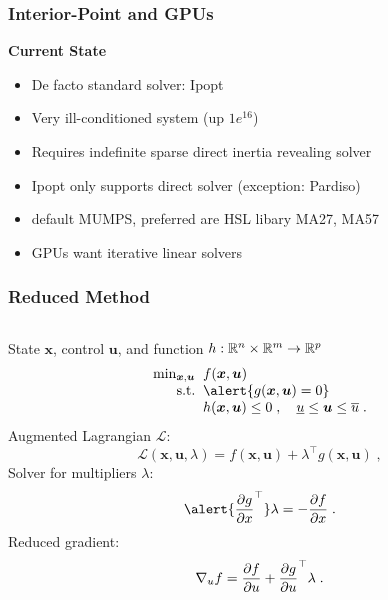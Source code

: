 \begin{frame}[fragile]
  \frametitle{Interior-Point and GPUs}
  {\bf Current State}
  \begin{itemize}
    \item De facto standard solver: Ipopt
    \item Very ill-conditioned system (up $1e^{16}$)
    \item Requires indefinite sparse direct inertia revealing solver
    \item Ipopt only supports direct solver (exception: Pardiso)
    \item default MUMPS, preferred are HSL libary MA27, MA57 
    \item \alert{GPUs want iterative linear solvers}
  \end{itemize}
\end{frame}

\begin{frame}
\frametitle{Reduced Method}
\begin{columns}
\begin{column}{0.7\linewidth}
  
  State $\bm{x}$, control $\bm{u}$, and function $h: \REAL^{n} \times \REAL^{m} \to \REAL^{p}$
  \begin{equation*}\label{eq:globalproblem}
    \begin{array}{r@{\;\;}l}
      \min_{\bm{x}, \bm{u}} & f(\bm{x}, \bm{u}) \\
      \text{s.t.} & \alert{g(\bm{x}, \bm{u}) = 0 }\\
                  & h(\bm{x}, \bm{u}) \leq 0 \;,
                  \quad \underline{u} \leq \bm{u} \leq \overline{u}  \;.
    \end{array}
  \end{equation*}
  Augmented Lagrangian $\mathcal{L}$:
  \begin{equation*}
    \mathcal{L}(\bm{x}, \bm{u}, \lambda) = f(\bm{x}, \bm{u}) + \lambda^\top g(\bm{x}, \bm{u}) \; ,
  \end{equation*}
  Solver for multipliers $\lambda$:
  \begin{equation*}
    \alert{\dpart{g}{x}^\top} \lambda = -\dpart{f}{x}  \; .
  \end{equation*}
  Reduced gradient:
  \begin{equation*}
    \grad{f}{u} = \dpart{f}{u} + \dpart{g}{u}^\top\lambda \; .
  \end{equation*}
\end{column}
\end{columns}
\end{frame}




